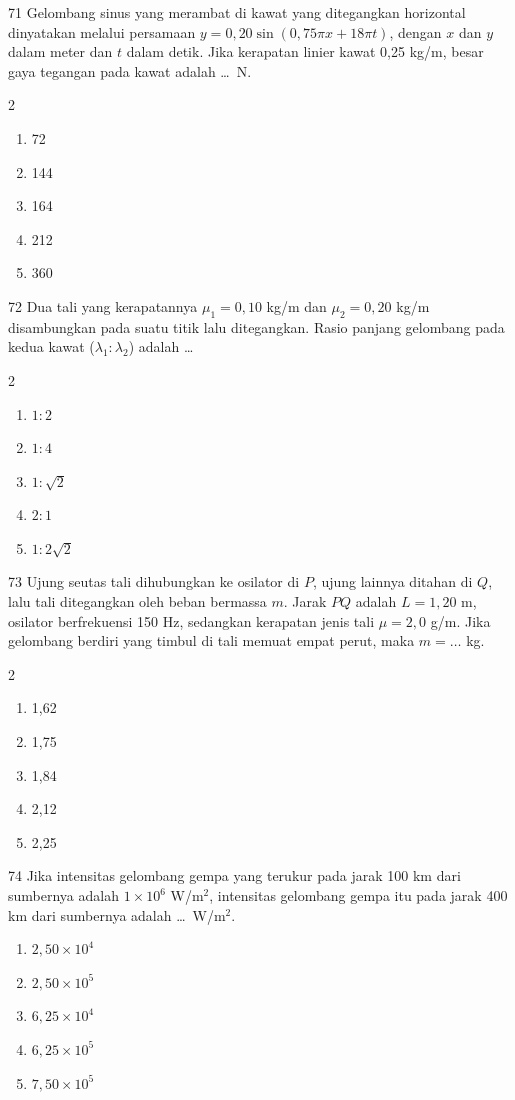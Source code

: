\documentclass[11pt]{article}
\newenvironment{pil}{%
  \begin{enumerate}[label=(\Alph*),leftmargin=*,itemsep=1pt,topsep=3pt]}%
  {\end{enumerate}}
\newenvironment{pilB}{%
  \par\smallskip\begin{multicols}{2}
  \begin{enumerate}[label=(\Alph*),leftmargin=*,itemsep=1pt,topsep=3pt]}%
  {\end{enumerate}\end{multicols}}
\begin{document}
\begin{soal}{71}
Gelombang sinus yang merambat di kawat yang ditegangkan horizontal
dinyatakan melalui persamaan $y=0{,}20\sin(0{,}75\pi x+18\pi t)$,
dengan $x$ dan $y$ dalam meter dan $t$ dalam detik. Jika kerapatan
linier kawat 0,25 kg/m, besar gaya tegangan pada kawat adalah \ldots\ N.
\begin{pilB}
  \item 72 \item 144 \item 164 \item 212 \item 360
\end{pilB}
\end{soal}

\begin{soal}{72}
Dua tali yang kerapatannya $\mu_1=0{,}10$ kg/m dan $\mu_2=0{,}20$ kg/m
disambungkan pada suatu titik lalu ditegangkan. Rasio panjang gelombang
pada kedua kawat ($\lambda_1:\lambda_2$) adalah \ldots
\begin{pilB}
  \item $1:2$ \item $1:4$ \item $1:\sqrt{2}$ \item $2:1$ \item $1:2\sqrt{2}$
\end{pilB}
\end{soal}

\begin{soal}{73}
Ujung seutas tali dihubungkan ke osilator di $P$, ujung lainnya ditahan
di $Q$, lalu tali ditegangkan oleh beban bermassa $m$. Jarak $PQ$
adalah $L=1{,}20$ m, osilator berfrekuensi 150 Hz, sedangkan kerapatan
jenis tali $\mu=2{,}0$ g/m. Jika gelombang berdiri yang timbul di tali
memuat empat perut, maka $m=\ldots$ kg.
\begin{pilB}
  \item 1,62 \item 1,75 \item 1,84 \item 2,12 \item 2,25
\end{pilB}
\end{soal}

\begin{soal}{74}
Jika intensitas gelombang gempa yang terukur pada jarak 100 km dari
sumbernya adalah $1\times10^{6}$ W/m$^2$, intensitas gelombang gempa
itu pada jarak 400 km dari sumbernya adalah \ldots\ W/m$^2$.
\begin{pil}
  \item $2{,}50\times10^4$ \item $2{,}50\times10^5$ \item $6{,}25\times10^4$
  \item $6{,}25\times10^5$ \item $7{,}50\times10^5$
\end{pil}
\end{soal}
\end{document}
